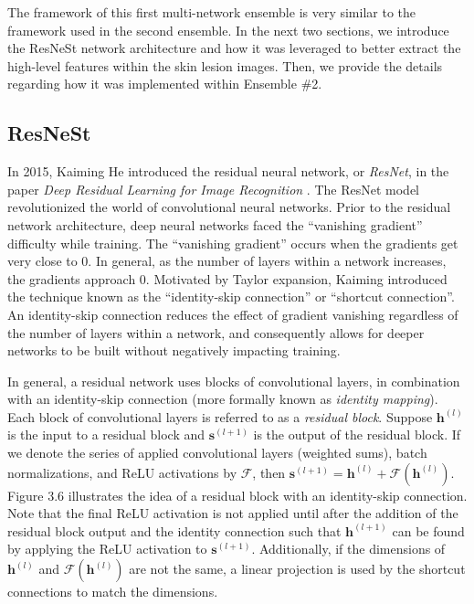 \documentclass [MAS] {uclathes}
\begin{document}
The framework of this first multi-network ensemble is very similar to the framework used in the second ensemble. In the next two sections, we introduce the ResNeSt network architecture and how it was leveraged to better extract the high-level features within the skin lesion images. Then, we provide the details regarding how it was implemented within Ensemble \#2.

\subsection{ResNeSt}

In 2015, Kaiming He introduced the residual neural network, or \textit{ResNet}, in the paper \textit{Deep Residual Learning for Image Recognition} \cite{resnet}. The ResNet model revolutionized the world of convolutional neural networks. Prior to the residual network architecture, deep neural networks faced the ``vanishing gradient'' difficulty while training. The ``vanishing gradient'' occurs when the gradients get very close to 0. In general, as the number of layers within a network increases, the gradients approach 0. Motivated by Taylor expansion, Kaiming introduced the technique known as the ``identity-skip connection'' or ``shortcut connection''. An identity-skip connection reduces the effect of gradient vanishing regardless of the number of layers within a network, and consequently allows for deeper networks to be built without negatively impacting training. 

In general, a residual network uses blocks of convolutional layers, in combination with an identity-skip connection (more formally known as \textit{identity mapping}). Each block of convolutional layers is referred to as a \textit{residual block}. Suppose $\mathbf{h}^{(l)}$ is the input to a residual block and $\mathbf{s}^{(l+1)}$ is the output of the residual block. If we denote the series of applied convolutional layers (weighted sums), batch normalizations, and ReLU activations by $\mathcal{F}$, then $\mathbf{s}^{(l+1)} = \mathbf{h}^{(l)} + \mathcal{F}(\mathbf{h}^{(l)})$. Figure 3.6 illustrates the idea of a residual block with an identity-skip connection. Note that the final ReLU activation is not applied until after the addition of the residual block output and the identity connection such that $\mathbf{h}^{(l+1)}$ can be found by applying the ReLU activation to $\mathbf{s}^{(l+1)}$. Additionally, if the dimensions of $\mathbf{h}^{(l)}$ and $\mathcal{F}(\mathbf{h}^{(l)})$ are not the same, a linear projection is used by the shortcut connections to match the dimensions.
\end{document}
